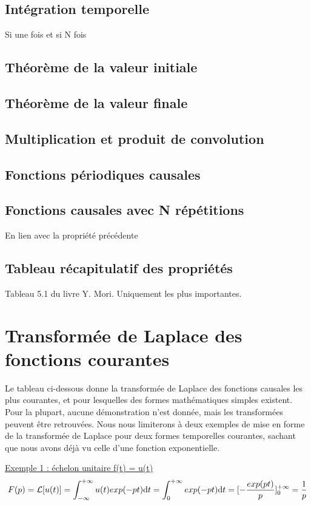 \documentclass[]{book}
\begin{document}
{	\subsection{Intégration temporelle}
	Si une fois et si N fois
	
	\subsection{Théorème de la valeur initiale}
	
	\subsection{Théorème de la valeur finale}
	
	\subsection{Multiplication et produit de convolution}
	
	\subsection{Fonctions périodiques causales}
	
	\subsection{Fonctions causales avec N répétitions}
	En lien avec la propriété précédente
	
	\subsection{Tableau récapitulatif des propriétés}
	Tableau 5.1 du livre Y. Mori.
	Uniquement les plus importantes.
	
	
	\section{Transformée de Laplace des fonctions courantes}
	Le tableau ci-dessous donne la transformée de Laplace des fonctions causales les plus courantes, et pour lesquelles des formes mathématiques simples existent. Pour la plupart, aucune démonstration n'est donnée, mais les transformées peuvent être retrouvées. Nous nous limiterons à deux exemples de mise en forme de la transformée de Laplace pour deux formes temporelles courantes, sachant que nous avons déjà vu celle d'une fonction exponentielle.
	
	\underline{Exemple 1 : échelon unitaire f(t) = u(t)}
	\begin{equation*}
	F(p)=\mathcal{L}[u(t)] = \int_{-\infty}^{+\infty}u(t)exp(-pt) \mathrm{d} t =\int_{0}^{+\infty}exp(-pt) \mathrm{d} t = [-\frac{exp(pt)}{p}]_{0}^{+\infty}=\frac{1}{p}
	\end{equation*}
	
}
\end{document}
